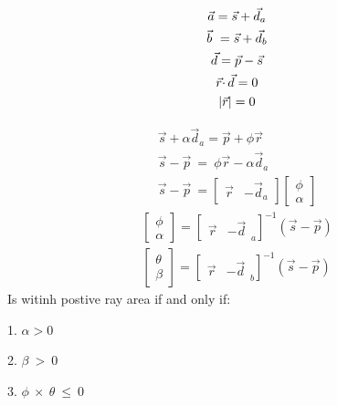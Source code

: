 
\begin{gather}
\vec{a} =\vec{s} +\vec{d}_{a}\\
\vec{b} \ =\vec{s} +\vec{d}_{b} \notag\\
\vec{d} =\vec{p} -\vec{s} \notag\\
\vec{r} \cdotp \vec{d} =0 \notag\\
\mathnormal{| }\vec{r}| =0 \notag
\end{gather}
\begin{center}

\end{center}

\begin{gather*}
\vec{s} +\alpha \vec{d}_{a} =\vec{p} +\phi \vec{r}\\
\vec{s} -\vec{p} \ =\ \phi \vec{r} -\alpha \vec{d}_{a}\\
\vec{s} -\vec{p} \ =\left[\begin{matrix}
\vec{r} & -\vec{d}_{a}
\end{matrix}\right]\left[\begin{matrix}
\phi \\
\alpha
\end{matrix}\right]
\end{gather*}
\begin{gather*}
\left[\begin{matrix}
\phi \\
\alpha
\end{matrix}\right] =\left[\begin{matrix}
\vec{r} & -\vec{d}
\end{matrix}_{a}\right]^{-1}(\vec{s} -\vec{p})\\
\left[\begin{matrix}
\theta \\
\beta
\end{matrix}\right] =\left[\begin{matrix}
\vec{r} & -\vec{d}
\end{matrix}_{b}\right]^{-1}(\vec{s} -\vec{p})
\end{gather*}
Is witinh postive ray area if and only if:

1. $\displaystyle \alpha  >0$

2. $\displaystyle \beta \  >\ 0$

3. $\displaystyle \phi \ \times \ \theta \ \leq \ 0$